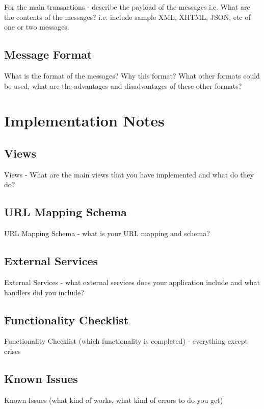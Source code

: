\documentclass{sig-alt-release2}
\begin{document}
For the main transactions - describe the payload of the messages 
i.e. What are the contents of the messages? i.e. include sample XML, XHTML, JSON, etc of one or two messages.

\subsection{Message Format}

What is the format of the messages? 
Why this format? 
What other formats could be used, what are the advantages and disadvantages of these other formats?

\section{Implementation Notes}

\subsection{Views}

Views - What are the main views that you have implemented and what do they do?

\subsection{URL Mapping Schema}

URL Mapping Schema - what is your URL mapping and schema?

\subsection{External Services}

External Services  - what external services does your application include and what handlers did you include?

\subsection{Functionality Checklist}

Functionality Checklist (which functionality is completed) - everything except crises

\subsection{Known Issues}

Known Issues (what kind of works, what kind of errors to do you get)
\end{document}
